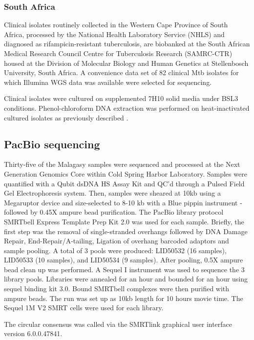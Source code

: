 \subsubsection{South Africa}
Clinical \mtb{} isolates routinely collected in the Western Cape Province of South Africa, processed by the National Health Laboratory Service (NHLS) and diagnosed as rifampicin-resistant tuberculosis, are biobanked at the South African Medical Research Council Centre for Tuberculosis Research (SAMRC-CTR) housed at the Division of Molecular Biology and Human Genetics at Stellenbosch University, South Africa. A convenience data set of 82 clinical Mtb isolates for which Illumina WGS data was available were selected for \ont{} sequencing.  

Clinical \mtb{} isolates were cultured on supplemented 7H10 solid media under BSL3 conditions. Phenol-chloroform DNA extraction was performed on heat-inactivated cultured isolates as previously described \cite{Warren2006}.

\subsection{PacBio sequencing}
\label{app:pacbio-seq}

Thirty-five of the Malagasy samples were sequenced and processed at the Next Generation Genomics Core within Cold Spring Harbor Laboratory. Samples were quantified with a Qubit dsDNA HS Assay Kit and QC’d through a Pulsed Field Gel Electrophoresis system. Then, samples were sheared at 10kb using a Megaruptor device and size-selected to 8-10 kb with a Blue pippin instrument - followed by 0.45X ampure bead purification. The PacBio library protocol SMRTbell Express Template Prep Kit 2.0 was used for each sample. Briefly, the first step was the removal of single-stranded overhangs followed by DNA Damage Repair, End-Repair/A-tailing, Ligation of overhang barcoded adaptors and sample pooling. A total of 3 pools were produced: LID50532 (16 samples), LID50533 (10 samples), and LID50534 (9 samples). After pooling, 0.5X ampure bead clean up was performed. A Sequel I instrument was used to sequence the 3 library pools. Libraries were annealed for an hour and bounded for an hour using sequel binding kit 3.0. Bound SMRTbell complexes were then purified with ampure beads. The run was set up as 10kb length for 10 hours movie time. The Sequel 1M V2 SMRT cells were used for each library.  

The circular consensus was called via the SMRTlink graphical user interface version 6.0.0.47841.

